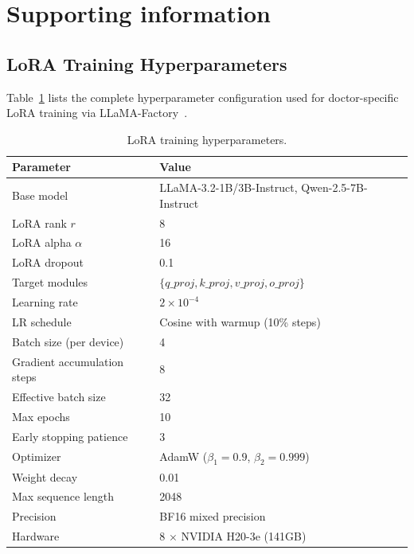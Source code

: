 ﻿\section*{Supporting information}


\subsection*{LoRA Training Hyperparameters}

Table~\ref{tab:hyperparams} lists the complete hyperparameter configuration used for doctor-specific LoRA training via LLaMA-Factory~\cite{zheng2024llamafactory}.

\begin{table}[H]
\caption{LoRA training hyperparameters.\label{tab:hyperparams}}
\begin{tabularx}{\textwidth}{lX}
\toprule
\textbf{Parameter} & \textbf{Value} \\
\midrule
Base model & LLaMA-3.2-1B/3B-Instruct, Qwen-2.5-7B-Instruct \\
LoRA rank $r$ & 8 \\
LoRA alpha $\alpha$ & 16 \\
LoRA dropout & 0.1 \\
Target modules & $\{q\_proj, k\_proj, v\_proj, o\_proj\}$ \\
Learning rate & $2 \times 10^{-4}$ \\
LR schedule & Cosine with warmup (10\% steps) \\
Batch size (per device) & 4 \\
Gradient accumulation steps & 8 \\
Effective batch size & 32 \\
Max epochs & 10 \\
Early stopping patience & 3 \\
Optimizer & AdamW ($\beta_1=0.9$, $\beta_2=0.999$) \\
Weight decay & 0.01 \\
Max sequence length & 2048 \\
Precision & BF16 mixed precision \\
Hardware & 8 $\times$ NVIDIA H20-3e (141GB) \\
\bottomrule
\end{tabularx}
\end{table}

